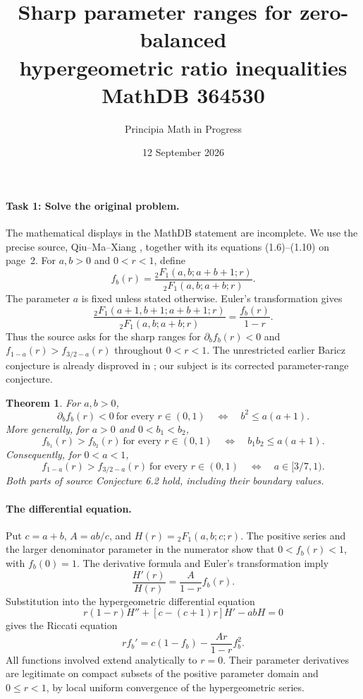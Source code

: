 \documentclass[11pt]{article}
\title{Sharp parameter ranges for zero-balanced\\hypergeometric ratio inequalities\\MathDB 364530}
\author{Principia Math in Progress}
\date{12 September 2026}
\newtheorem{theorem}{Theorem}
\newcommand{\hyp}{{}_2F_1}
\begin{document}
\maketitle

\paragraph{Task 1: Solve the original problem.}
The mathematical displays in the MathDB statement are incomplete.
We use the precise source, Qiu--Ma--Xiang \cite[Conjecture 6.2,
p.~22]{Q}, together with its equations (1.6)--(1.10) on page~2.
For \(a,b>0\) and \(0<r<1\), define
\[
 f_b(r)=\frac{\hyp(a,b;a+b+1;r)}{\hyp(a,b;a+b;r)}.
\]
The parameter \(a\) is fixed unless stated otherwise. Euler's
transformation gives
\[
 \frac{\hyp(a+1,b+1;a+b+1;r)}{\hyp(a,b;a+b;r)}
 =\frac{f_b(r)}{1-r}.
\]
Thus the source asks for the sharp ranges for
\(\partial_b f_b(r)<0\) and
\(f_{1-a}(r)>f_{3/2-a}(r)\) throughout \(0<r<1\).
The unrestricted earlier Baricz conjecture is already disproved in
\cite{Q}; our subject is its corrected parameter-range conjecture.

\begin{theorem}\label{main}
For \(a,b>0\),
\begin{equation}\label{derivativecriterion}
 \partial_b f_b(r)<0\ \text{for every }r\in(0,1)
 \quad\Longleftrightarrow\quad b^2\le a(a+1).
\end{equation}
More generally, for \(a>0\) and \(0<b_1<b_2\),
\begin{equation}\label{paircriterion}
 f_{b_1}(r)>f_{b_2}(r)\ \text{for every }r\in(0,1)
 \quad\Longleftrightarrow\quad b_1b_2\le a(a+1).
\end{equation}
Consequently, for \(0<a<1\),
\[
 f_{1-a}(r)>f_{3/2-a}(r)\ \text{for every }r\in(0,1)
 \quad\Longleftrightarrow\quad a\in[3/7,1).
\]
Both parts of source Conjecture 6.2 hold, including their boundary values.
\end{theorem}

\paragraph{The differential equation.}
Put \(c=a+b\), \(A=ab/c\), and \(H(r)=\hyp(a,b;c;r)\).
The positive series and the larger denominator parameter in the numerator
show that \(0<f_b(r)<1\), with \(f_b(0)=1\).
The derivative formula and Euler's transformation imply
\[
 \frac{H'(r)}{H(r)}=\frac{A}{1-r}f_b(r).
\]
Substitution into the hypergeometric differential equation
\[
 r(1-r)H''+[c-(c+1)r]H'-abH=0
\]
gives the Riccati equation
\begin{equation}\label{riccati}
 r f_b'=c(1-f_b)-\frac{Ar}{1-r}f_b^2.
\end{equation}
All functions involved extend analytically to \(r=0\).
Their parameter derivatives are legitimate on compact subsets of the
positive parameter domain and \(0\le r<1\), by local uniform convergence
of the hypergeometric series.
\end{document}
